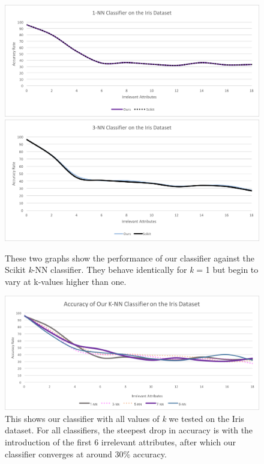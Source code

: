 \documentclass{article}
\begin{document}
\begin{figure}[hbt]
\centering
\includegraphics[scale=0.7]{ours-vs-scikit} \\
\includegraphics[scale=0.7]{ours-vs-scikit2} 
\caption{These two graphs show the performance of our classifier against the Scikit \textit{k}-NN classifier. They behave identically for \textit{k} = 1 but begin to vary at k-values higher than one.}
\end{figure}

\begin{figure}[hbt]
\centering
\includegraphics[scale=0.6]{our-knn-iris-full} 
\caption{This shows our classifier with all values of \textit{k} we tested on the Iris dataset. For all classifiers, the steepest drop in accuracy is with the introduction of the first 6 irrelevant attributes, after which our classifier converges at around 30\% accuracy.}
\end{figure}
\end{document}
